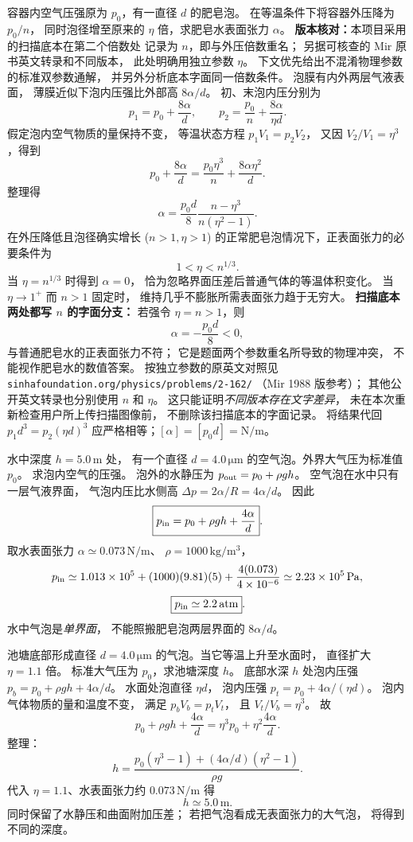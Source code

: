 容器内空气压强原为 $p_0$，有一直径 $d$ 的肥皂泡。
在等温条件下将容器外压降为 $p_0/n$，
同时泡径增至原来的 $\eta$ 倍，求肥皂水表面张力 $\alpha$。
\textbf{版本核对：}本项目采用的扫描底本在第二个倍数处
记录为 $n$，即与外压倍数重名；
另据可核查的 Mir 原书英文转录和不同版本，
此处明确用独立参数 $\eta$。
下文优先给出不混淆物理参数的标准双参数通解，
并另外分析底本字面同一倍数条件。
\exsolution
泡膜有内外两层气液表面，
薄膜近似下泡内压强比外部高 $8\alpha/d$。
初、末泡内压分别为
\[
 p_1=p_0+\frac{8\alpha}{d},\qquad
 p_2=\frac{p_0}{n}+\frac{8\alpha}{\eta d}.
\]
假定泡内空气物质的量保持不变，
等温状态方程 $p_1V_1=p_2V_2$，
又因 $V_2/V_1=\eta^3$，得到
\[
 p_0+\frac{8\alpha}{d}
 =\frac{p_0\eta^3}{n}
   +\frac{8\alpha\eta^2}{d}.
\]
整理得
\[
 \boxed{\alpha=\frac{p_0d}{8}
       \frac{n-\eta^3}{n(\eta^2-1)}}.
\]
在外压降低且泡径确实增长 ($n>1,\eta>1$)
的正常肥皂泡情况下，正表面张力的必要条件为
\[
 \boxed{1<\eta<n^{1/3}}.
\]
当 $\eta=n^{1/3}$ 时得到 $\alpha=0$，
恰为忽略界面压差后普通气体的等温体积变化。
当 $\eta\to1^+$ 而 $n>1$ 固定时，
维持几乎不膨胀所需表面张力趋于无穷大。
\textbf{扫描底本两处都写 $n$ 的字面分支：}
若强令 $\eta=n>1$，则
\[
 \boxed{\alpha=-\frac{p_0d}{8}<0},
\]
与普通肥皂水的正表面张力不符；
它是题面两个参数重名所导致的物理冲突，
不能视作肥皂水的数值答案。
\excheck
按独立参数的原英文对照见
\texttt{sinhafoundation.org/physics/problems/2-162/}
（Mir 1988 版参考）；
其他公开英文转录也分别使用 $n$ 和 $\eta$。
这只能证明\emph{不同版本存在文字差异}，
未在本次重新检查用户所上传扫描图像前，
不删除该扫描底本的字面记录。
将结果代回 $p_1d^3=p_2(\eta d)^3$
应严格相等；$[\alpha]=[p_0d]=\mathrm{N/m}$。

水中深度 $h=5.0\,\mathrm m$ 处，
有一个直径 $d=4.0\,\mathrm{\mu m}$
的空气泡。外界大气压为标准值 $p_0$。
求泡内空气的压强。
\exsolution
泡外的水静压为
$p_{\rm out}=p_0+\rho gh$。
空气泡在水中只有一层气液界面，
气泡内压比水侧高
$\Delta p=2\alpha/R=4\alpha/d$。
因此
\[
\boxed{p_{\rm in}=p_0+\rho gh+\frac{4\alpha}{d}}.
\]
取水表面张力
$\alpha\simeq0.073\,\mathrm{N/m}$、
$\rho=1000\,\mathrm{kg/m^3}$，
\[
p_{\rm in}\simeq1.013\times10^5+
(1000)(9.81)(5)+\frac{4(0.073)}{4\times10^{-6}}
\simeq2.23\times10^5\,\mathrm{Pa},
\]
\[
\boxed{p_{\rm in}\simeq2.2\,\mathrm{atm}}.
\]
\excheck 水中气泡是\emph{单界面}，
不能照搬肥皂泡两层界面的 $8\alpha/d$。

池塘底部形成直径 $d=4.0\,\mathrm{\mu m}$
的气泡。当它等温上升至水面时，
直径扩大 $\eta=1.1$ 倍。
标准大气压为 $p_0$，求池塘深度 $h$。
\exsolution
底部水深 $h$ 处泡内压强
$p_b=p_0+\rho gh+4\alpha/d$。
水面处泡直径 $\eta d$，
泡内压强
$p_t=p_0+4\alpha/(\eta d)$。
泡内气体物质的量和温度不变，
满足
$p_bV_b=p_tV_t$，
且 $V_t/V_b=\eta^3$。
故
\[
p_0+\rho gh+\frac{4\alpha}{d}
=\eta^3p_0+\eta^2\frac{4\alpha}{d}.
\]
整理：
\[
\boxed{h=\frac{
p_0(\eta^3-1)+(4\alpha/d)(\eta^2-1)
}{\rho g}}.
\]
代入 $\eta=1.1$、水表面张力约
$0.073\,\mathrm{N/m}$ 得
\[
\boxed{h\simeq5.0\,\mathrm m}.
\]
\excheck 同时保留了水静压和曲面附加压差；
若把气泡看成无表面张力的大气泡，
将得到不同的深度。

